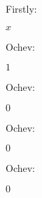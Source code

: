 \documentclass[12pt]{article}
\begin{document}
Firstly: 
\begin{center}
$ x $
\end{center}
Ochev: 
\begin{center}
$ 1 $
\end{center}
Ochev: 
\begin{center}
$ 0 $
\end{center}
Ochev: 
\begin{center}
$ 0 $
\end{center}
Ochev: 
\begin{center}
$ 0 $
\end{center}
\end{document}
